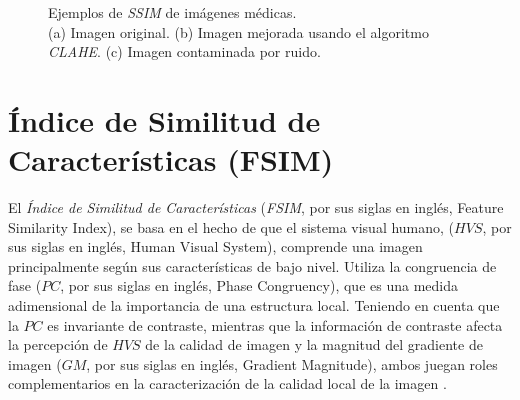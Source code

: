 \begin{figure}[H]
    \begin{center}
    \end{center}
     \caption{Ejemplos de \textit{SSIM} de imágenes médicas. \\
    (a) Imagen original.
    (b) Imagen mejorada usando el algoritmo \textit{CLAHE}.
    (c) Imagen contaminada por ruido.}
    \label{fig:ssim}
\end{figure}

\section{Índice de Similitud de Características (FSIM)} 
\label{sec:fsim}

El \textit{Índice de Similitud de Características} (\textit{FSIM}, por sus siglas en inglés, Feature Similarity Index), se basa en el hecho de que el sistema visual humano, ($HVS$, por sus siglas en inglés, Human Visual System), comprende una imagen principalmente según sus características de bajo nivel. Utiliza la congruencia de fase ($PC$, por sus siglas en inglés, Phase Congruency), que es una medida adimensional de la importancia de una estructura local. Teniendo en cuenta que la $PC$ es invariante de contraste, mientras que la información de contraste afecta la percepción de $HVS$ de la calidad de imagen y la magnitud del gradiente de imagen ($GM$, por sus siglas en inglés, Gradient Magnitude), ambos juegan roles complementarios en la caracterización de la calidad local de la imagen \cite{fsim2011}.


